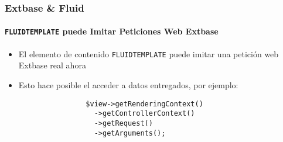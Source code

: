 \begin{frame}[fragile]
	\frametitle{Extbase \& Fluid}
	\framesubtitle{\texttt{FLUIDTEMPLATE} puede Imitar Peticiones Web Extbase}

	\lstset{basicstyle=\small\ttfamily}

	\begin{itemize}
		\item El elemento de contenido \texttt{FLUIDTEMPLATE} puede imitar una petición web Extbase real ahora
		\item Esto hace posible el acceder a datos entregados, por ejemplo:

			\begin{lstlisting}
				$view->getRenderingContext()
				  ->getControllerContext()
				  ->getRequest()
				  ->getArguments();
			\end{lstlisting}

	\end{itemize}

\end{frame}




